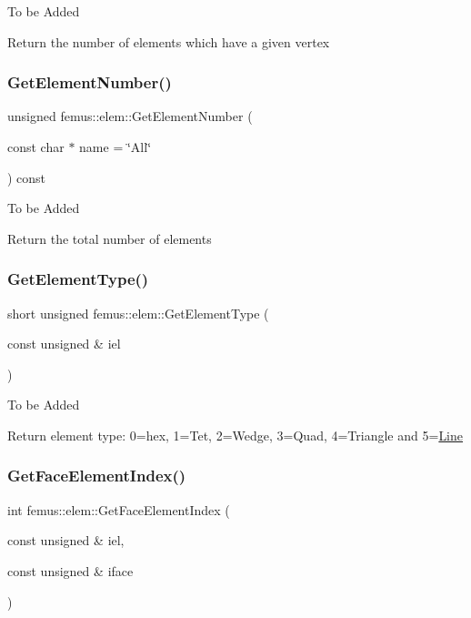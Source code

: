 To be Added

Return the number of elements which have a given vertex \mbox{\label{classfemus_1_1elem_a199d03d1a04221741f3207d62ad755ca}} 
\subsubsection{\texorpdfstring{Get\+Element\+Number()}{GetElementNumber()}}
{\footnotesize\ttfamily unsigned femus\+::elem\+::\+Get\+Element\+Number (\begin{DoxyParamCaption}\item[{const char $\ast$}]{name = {\ttfamily \char`\"{}All\char`\"{}} }\end{DoxyParamCaption}) const}

To be Added

Return the total number of elements \mbox{\label{classfemus_1_1elem_a9389fca6b346d241873c46d1f9357689}} 
\subsubsection{\texorpdfstring{Get\+Element\+Type()}{GetElementType()}}
{\footnotesize\ttfamily short unsigned femus\+::elem\+::\+Get\+Element\+Type (\begin{DoxyParamCaption}\item[{const unsigned \&}]{iel }\end{DoxyParamCaption})}

To be Added

Return element type\+: 0=hex, 1=Tet, 2=Wedge, 3=Quad, 4=Triangle and 5=\mbox{\hyperlink{classfemus_1_1_line}{Line}} \mbox{\label{classfemus_1_1elem_a491172d27d04d10ce166f42161d0c1d1}} 
\subsubsection{\texorpdfstring{Get\+Face\+Element\+Index()}{GetFaceElementIndex()}}
{\footnotesize\ttfamily int femus\+::elem\+::\+Get\+Face\+Element\+Index (\begin{DoxyParamCaption}\item[{const unsigned \&}]{iel,  }\item[{const unsigned \&}]{iface }\end{DoxyParamCaption})}


